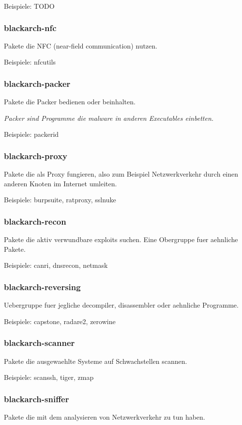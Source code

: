 \documentclass[a4paper, oneside, 11pt]{book}
\begin{document}
Beispiele: TODO

\subsubsection{blackarch-nfc}
Pakete die NFC (near-field communication) nutzen.

Beispiele: nfcutils

\subsubsection{blackarch-packer}
Pakete die Packer bedienen oder beinhalten.

\textit{Packer sind Programme die malware in anderen Executables einbetten. }

Beispiele: packerid

\subsubsection{blackarch-proxy}
Pakete die als Proxy fungieren, also zum Beispiel Netzwerkverkehr durch einen
anderen Knoten im Internet umleiten.

Beispiele: burpsuite, ratproxy, sslnuke

\subsubsection{blackarch-recon}
Pakete die aktiv verwundbare exploits suchen.
Eine Obergruppe fuer aehnliche Pakete.

Beispiele: canri, dnsrecon, netmask

\subsubsection{blackarch-reversing}
Uebergruppe fuer jegliche decompiler, 
disassembler oder aehnliche Programme.

Beispiele: capstone, radare2, zerowine

\subsubsection{blackarch-scanner}
Pakete die ausgewaehlte Systeme auf Schwachstellen scannen.

Beispiele: scanssh, tiger, zmap

\subsubsection{blackarch-sniffer}
Pakete die mit dem analysieren von Netzwerkverkehr
zu tun haben.
\end{document}

